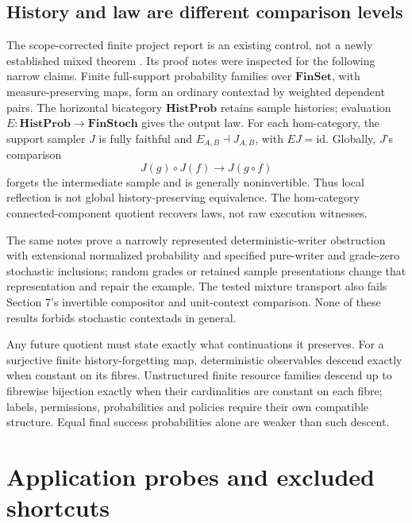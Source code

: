 \documentclass[11pt,a4paper]{article}
\newcommand{\FinSet}{\mathbf{FinSet}}
\newcommand{\id}{\mathrm{id}}
\newcommand{\HistProb}{\mathbf{HistProb}}
\newcommand{\FinStoch}{\mathbf{FinStoch}}
\begin{document}
\subsection{History and law are different comparison levels}

The scope-corrected finite project report is an existing control, not a newly
established mixed theorem \cite{Finite}. Its proof notes were inspected for the
following narrow claims. Finite full-support probability families over
\(\FinSet\), with measure-preserving maps, form an ordinary contextad by
weighted dependent pairs. The horizontal bicategory \(\HistProb\) retains sample
histories; evaluation \(E:\HistProb\to\FinStoch\) gives the output law.
For each hom-category, the support sampler \(J\) is fully faithful and
\(E_{A,B}\dashv J_{A,B}\), with \(EJ=\id\). Globally, \(J\)'s comparison
\[
 J(g)\circ J(f)\longrightarrow J(g\circ f)
\]
forgets the intermediate sample and is generally noninvertible. Thus local
reflection is not global history-preserving equivalence. The hom-category
connected-component quotient recovers laws, not raw execution witnesses.

The same notes prove a narrowly represented deterministic-writer obstruction
with extensional normalized probability and specified pure-writer and grade-zero
stochastic inclusions; random grades or retained sample presentations change that
representation and repair the example. The tested mixture transport also fails
Section 7's invertible compositor and unit-context comparison. None of these
results forbids stochastic contextads in general.

Any future quotient must state exactly what continuations it preserves.
For a surjective finite history-forgetting map, deterministic observables descend
exactly when constant on its fibres. Unstructured finite resource families descend
up to fibrewise bijection exactly when their cardinalities are constant on each
fibre; labels, permissions, probabilities and policies require their own compatible
structure. Equal final success probabilities alone are weaker than such descent.

\section{Application probes and excluded shortcuts}
\end{document}
